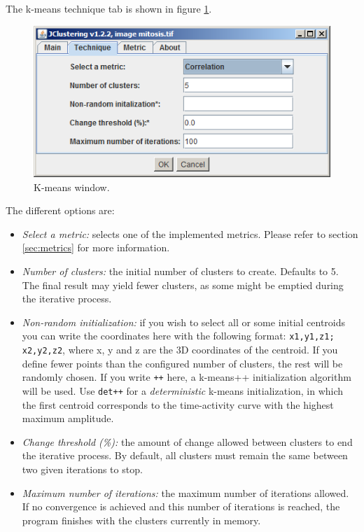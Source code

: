 \documentclass[11pt]{article} %
\begin{document}
The k-means technique tab is shown in figure \ref{fig:k-means_window}.

\begin{figure}[h!]
  \centering
    \includegraphics[width=\textwidth]{figures/k-means_window}
  \caption{K-means window.}
  \label{fig:k-means_window}
\end{figure}

The different options are:
\begin{itemize}
\item {\em Select a metric:} selects one of the implemented metrics. Please refer to section \ref{sec:metrics} for more
information.
\item {\em Number of clusters:} the initial number of clusters to create. Defaults to 5. The final result may yield fewer clusters, as
some might be emptied during the iterative process.
\item {\em Non-random initialization:} if you wish to select all or some initial centroids you can write the coordinates here
with the following format: \texttt{x1,y1,z1; x2,y2,z2}, where x, y and z are the 3D coordinates of the centroid. If you define
fewer points than the configured number of clusters, the rest will be randomly chosen. If you write \texttt{++} here, a 
k-means++ initialization algorithm will be used. Use \texttt{det++} for a \emph{deterministic} k-means initialization, in which 
the first centroid corresponds to the time-activity curve with the highest maximum amplitude.
\item {\em Change threshold (\%):} the amount of change allowed between clusters to end the iterative process. By default,
all clusters must remain the same between two given iterations to stop.
\item {\em Maximum number of iterations:} the maximum number of iterations allowed. If no convergence is achieved and this
number of iterations is reached, the program finishes with the clusters currently in memory.

\end{itemize}
\end{document}
